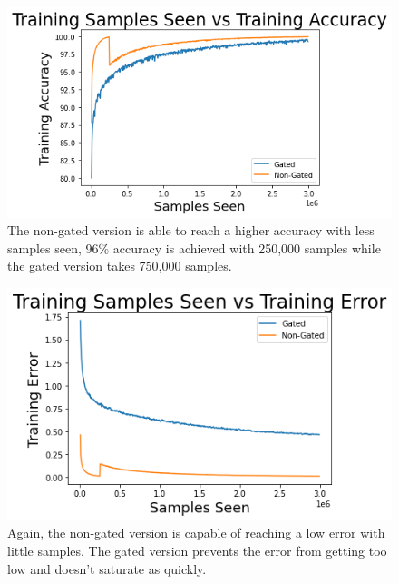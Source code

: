 \documentclass[prl,superscriptaddress,showpacs,twocolumn]{revtex4-1}
\begin{document}
\clearpage

\begin{figure}[H]
    \centering
    \includegraphics[width=\linewidth]{figures/samples_vs_training_accuracy.png}
    \caption{The non-gated version is able to reach a higher accuracy with less samples seen, 96\% accuracy is achieved with 250,000 samples while the gated version takes 750,000 samples.}
    \label{fig:train_acc}
\end{figure}

\begin{figure}[H]
    \centering
    \includegraphics[width=\linewidth]{figures/samples_vs_training_error.png}
    \caption{Again, the non-gated version is capable of reaching a low error with little samples. The gated version prevents the error from getting too low and doesn't saturate as quickly.}
    \label{fig:train_err}
\end{figure}

\vspace{5cm}
\newpage
\end{document}
